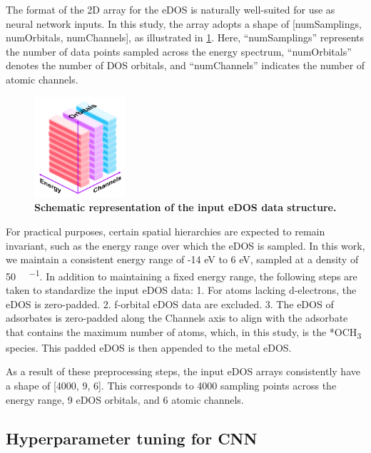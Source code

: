 \documentclass[a4paper, 12pt]{article}
\begin{document}
The format of the 2D array for the eDOS is naturally well-suited for use as neural network inputs.
In this study, the array adopts a shape of [numSamplings, numOrbitals, numChannels], as illustrated in \cref{supp_fig20:input_dos}.
Here, ``numSamplings'' represents the number of data points sampled across the energy spectrum,
``numOrbitals'' denotes the number of DOS orbitals,
and ``numChannels'' indicates the number of atomic channels.

\begin{figure}[htbp]
  \centering
  \includegraphics[width=0.3\textwidth]{supp_fig20_input_dos.png}
  \caption{\textbf{Schematic representation of the input eDOS data structure.}}
  \label{supp_fig20:input_dos}
\end{figure}

For practical purposes, certain spatial hierarchies are expected to remain invariant,
such as the energy range over which the eDOS is sampled.
In this work, we maintain a consistent energy range of -14 eV to 6 eV,
sampled at a density of 50 \si{ \cdot {}^{-1}}.
In addition to maintaining a fixed energy range,
the following steps are taken to standardize the input eDOS data:
  1.	For atoms lacking d-electrons, the eDOS is zero-padded.
  2.	f-orbital eDOS data are excluded.
  3.	The eDOS of adsorbates is zero-padded along the Channels axis to align with the adsorbate that contains the maximum number of atoms, which, in this study, is the *OCH\textsubscript{3} species. This padded eDOS is then appended to the metal eDOS.

As a result of these preprocessing steps, the input eDOS arrays consistently have a shape of [4000, 9, 6].
This corresponds to 4000 sampling points across the energy range, 9 eDOS orbitals, and 6 atomic channels.

\subsection{Hyperparameter tuning for CNN}
\label{supp_sec3.4_hyperparam}
\end{document}
